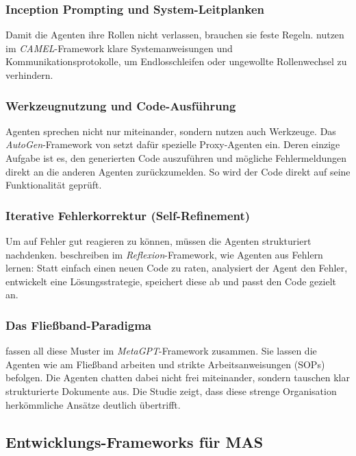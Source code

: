 \subsubsection{Inception Prompting und System-Leitplanken}
Damit die Agenten ihre Rollen nicht verlassen, brauchen sie feste Regeln. \textcite{liCamelCommunicativeAgents2023} nutzen im \textit{CAMEL}-Framework klare Systemanweisungen und Kommunikationsprotokolle, um Endlosschleifen oder ungewollte Rollenwechsel zu verhindern.

\subsubsection{Werkzeugnutzung und Code-Ausführung}
Agenten sprechen nicht nur miteinander, sondern nutzen auch Werkzeuge. Das \textit{AutoGen}-Framework von \textcite{wuAutogenEnablingNextgen2024} setzt dafür spezielle Proxy-Agenten ein. Deren einzige Aufgabe ist es, den generierten Code auszuführen und mögliche Fehlermeldungen direkt an die anderen Agenten zurückzumelden. So wird der Code direkt auf seine Funktionalität geprüft.

\subsubsection{Iterative Fehlerkorrektur (Self-Refinement)}
Um auf Fehler gut reagieren zu können, müssen die Agenten strukturiert nachdenken. \textcite{shinnReflexionLanguageAgents2023} beschreiben im \textit{Reflexion}-Framework, wie Agenten aus Fehlern lernen: Statt einfach einen neuen Code zu raten, analysiert der Agent den Fehler, entwickelt eine Lösungsstrategie, speichert diese ab und passt den Code gezielt an.

\subsubsection{Das Fließband-Paradigma}
\textcite{hongMetaGPTMetaProgramming2024} fassen all diese Muster im \textit{MetaGPT}-Framework zusammen. Sie lassen die Agenten wie am Fließband arbeiten und strikte Arbeitsanweisungen (SOPs) befolgen. Die Agenten chatten dabei nicht frei miteinander, sondern tauschen klar strukturierte Dokumente aus. Die Studie zeigt, dass diese strenge Organisation herkömmliche Ansätze deutlich übertrifft.

\subsection{Entwicklungs-Frameworks für \ac{MAS}}
\label{subsec:entwicklungs_frameworks}

